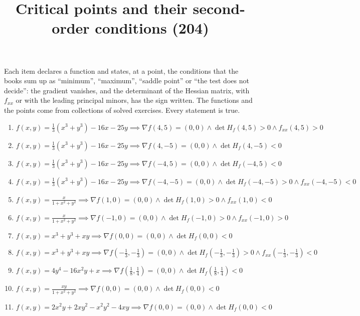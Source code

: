 \documentclass[11pt,a4paper]{article}
\title{Critical points and their second-order conditions (204)}
\author{}
\date{}
\begin{document}
\maketitle
Each item declares a function and states, at a point, the conditions that the books sum up as ``minimum'', ``maximum'', ``saddle point'' or ``the test does not decide'': the gradient vanishes, and the determinant of the Hessian matrix, with $f_{xx}$ or with the leading principal minors, has the sign written. The functions and the points come from collections of solved exercises. Every statement is true.

\begin{enumerate}
\item $\displaystyle f(x, y) = \frac{1}{3}(x^{3} + y^{3}) - 16x - 25y \implies \nabla f(4, 5) = (0, 0) \land \det H_{f}(4, 5) > 0 \land f_{xx}(4, 5) > 0$
\item $\displaystyle f(x, y) = \frac{1}{3}(x^{3} + y^{3}) - 16x - 25y \implies \nabla f(4, -5) = (0, 0) \land \det H_{f}(4, -5) < 0$
\item $\displaystyle f(x, y) = \frac{1}{3}(x^{3} + y^{3}) - 16x - 25y \implies \nabla f(-4, 5) = (0, 0) \land \det H_{f}(-4, 5) < 0$
\item $\displaystyle f(x, y) = \frac{1}{3}(x^{3} + y^{3}) - 16x - 25y \implies \nabla f(-4, -5) = (0, 0) \land \det H_{f}(-4, -5) > 0 \land f_{xx}(-4, -5) < 0$
\item $\displaystyle f(x, y) = \frac{x}{1 + x^{2} + y^{2}} \implies \nabla f(1, 0) = (0, 0) \land \det H_{f}(1, 0) > 0 \land f_{xx}(1, 0) < 0$
\item $\displaystyle f(x, y) = \frac{x}{1 + x^{2} + y^{2}} \implies \nabla f(-1, 0) = (0, 0) \land \det H_{f}(-1, 0) > 0 \land f_{xx}(-1, 0) > 0$
\item $\displaystyle f(x, y) = x^{3} + y^{3} + xy \implies \nabla f(0, 0) = (0, 0) \land \det H_{f}(0, 0) < 0$
\item $\displaystyle f(x, y) = x^{3} + y^{3} + xy \implies \nabla f\left( -\frac{1}{3}, -\frac{1}{3} \right) = (0, 0) \land \det H_{f}\left( -\frac{1}{3}, -\frac{1}{3} \right) > 0 \land f_{xx}\left( -\frac{1}{3}, -\frac{1}{3} \right) < 0$
\item $\displaystyle f(x, y) = 4y^{4} - 16x^{2} y + x \implies \nabla f\left( \frac{1}{8}, \frac{1}{4} \right) = (0, 0) \land \det H_{f}\left( \frac{1}{8}, \frac{1}{4} \right) < 0$
\item $\displaystyle f(x, y) = \frac{xy}{1 + x^{2} + y^{2}} \implies \nabla f(0, 0) = (0, 0) \land \det H_{f}(0, 0) < 0$
\item $\displaystyle f(x, y) = 2x^{2} y + 2x y^{2} - x^{2} y^{2} - 4xy \implies \nabla f(0, 0) = (0, 0) \land \det H_{f}(0, 0) < 0$

\end{enumerate}
\end{document}
